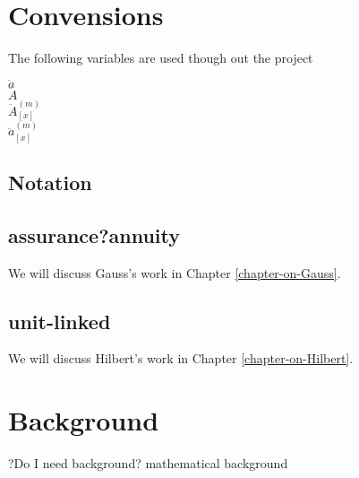 \documentclass{report}
\begin{document}
\chapter*{Convensions}

The following variables are used though out the project

$\ddot{a}$\\
$\ddot{A}$\\
$\ddot{A}^{(m)}_{[x]}$\\
$\ddot{a}^{(m)}_{[x]}$\\

\section*{Notation}
















\section*{assurance?annuity}

We will discuss Gauss's work in Chapter \ref{chapter-on-Gauss}.

\section*{unit-linked}

We will discuss Hilbert's work in Chapter \ref{chapter-on-Hilbert}.










\chapter*{Background}



?Do I need background? mathematical background
\end{document}
